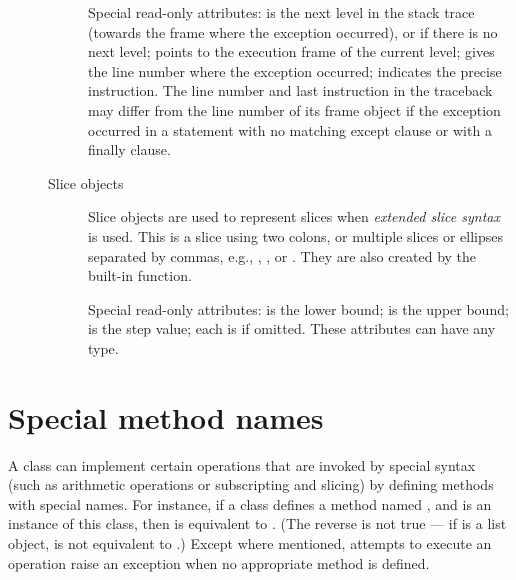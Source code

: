 \begin{description}
\begin{description}
Special read-only attributes:  is the next level in the
stack trace (towards the frame where the exception occurred), or
 if there is no next level;  points to the
execution frame of the current level;  gives the line
number where the exception occurred;  indicates the
precise instruction.  The line number and last instruction in the
traceback may differ from the line number of its frame object if the
exception occurred in a  statement with no matching
except clause or with a finally clause.

\item[Slice objects]
Slice objects are used to represent slices when \emph{extended slice
syntax} is used.  This is a slice using two colons, or multiple slices
or ellipses separated by commas, e.g., , , or .  They are also created by the built-in
 function.

Special read-only attributes:  is the lower bound;
 is the upper bound;  is the step value; each is
 if omitted. These attributes can have any type.

\end{description} %

\end{description} %


\section{Special method names\label{specialnames}}

A class can implement certain operations that are invoked by special
syntax (such as arithmetic operations or subscripting and slicing) by
defining methods with special names.  For instance, if a class defines
a method named , and  is an instance of
this class, then  is equivalent to
.  (The reverse is not true --- if  is
a list object,  is not equivalent to
.)  Except where mentioned, attempts to execute an
operation raise an exception when no appropriate method is defined.

